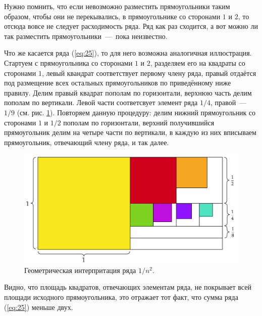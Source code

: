 \documentclass[12pt]{article}
\begin{document}
\par
Нужно помнить, что если невозможно разместить прямоугольники таким образом, чтобы они не перекывались, в прямоугольнике со сторонами $1$ и $2$, то отсюда вовсе не следует расходимость ряда. Ряд как раз сходится, а вот можно ли так разместить прямоугольники~\----~пока неизвестно.
\par
Что же касается ряда (\ref{eq:25}), то для него возможна аналогичная иллюстрация. Стартуем с прямоугольника со сторонами $1$ и $2$, разделяем его на квадраты со сторонами $1$, левый квандрат соответствует первому члену ряда, правый отдаётся под размещение всех остальных прямоугольников по приведённому ниже правилу. Делим правый квадрат пополам по горизонтали, верхнюю часть делим пополам по вертикали. Левой части соответсвует элемент ряда ${1}/{4}$, правой~\----~${1}/{9}$ (см. рис. \ref{fig:6}). Повторяем данную процедуру: делим нижний прямоугольник со сторонами $1$ и ${1}/{2}$ пополам по горизонтали, верхний получившийся прямоугольник делим на четыре части по вертикали, в каждую из них вписываем прямоугольник, отвечающий члену ряда, и так далее.
\begin{figure}[ht]
    \centering
    \includegraphics[width = 1\textwidth]{fig6.png}
    \caption{Геометрическая интерпритация ряда ${1}/{n^2}$.}
    \label{fig:6}
\end{figure}
\par
Видно, что площадь квадратов, отвечающих элементам ряда, не покрывает всей площади исходного прямоугольника, это отражает тот факт, что сумма ряда (\ref{eq:25}) меньше двух.
\end{document}
